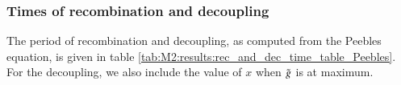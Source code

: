 \subsubsection{Times of recombination and decoupling} \label{sssec:M2:results:times_of_recombination_and_decoupling}
The period of recombination and decoupling, as computed from the Peebles equation, is given in table \ref{tab:M2:results:rec_and_dec_time_table_Peebles}. For the decoupling, we also include the value of $x$ when $\tilde{g}$ is at maximum.


